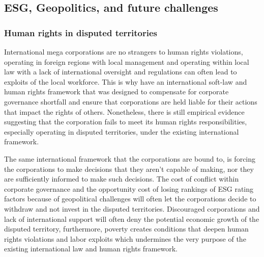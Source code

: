 \documentclass[a4paper, 12pt]{article}
\begin{document}

\subsection{ESG, Geopolitics, and future challenges}\label{ESG, Geopolitics, and future challenges}

\vspace{-5pt}
\subsubsection{Human rights in disputed territories}\label{Human rights in disputed territories}
\vspace{-10pt}
\hspace{12pt} International mega corporations are no strangers to human rights violations, operating in foreign regions with local management and operating within local law with a lack of international oversight and regulations can often lead to exploits of the local workforce. This is why have an international soft-law and human rights framework that was designed to compensate for corporate governance shortfall and ensure that corporations are held liable for their actions that impact the rights of others. Nonetheless, there is still empirical evidence suggesting that the corporation fails to meet its human rights responsibilities, especially operating in disputed territories, under the existing international framework. \cite{Ascencio}

The same international framework that the corporations are bound to, is forcing the corporations to make decisions that they aren't capable of making, nor they are sufficiently informed to make such decisions. The cost of conflict within corporate governance and the opportunity cost of losing rankings of ESG rating factors because of geopolitical challenges will often let the corporations decide to withdraw and not invest in the disputed territories. Discouraged corporations and lack of international support will often deny the potential economic growth of the disputed territory, furthermore, poverty creates conditions that deepen human rights violations and labor exploits which undermines the very purpose of the existing international law and human rights framework. 
\end{document}
